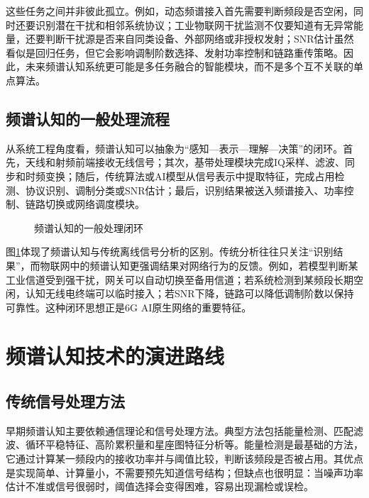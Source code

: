 \documentclass[UTF8,fontset=windows,zihao=-4]{ctexart}
\begin{document}
这些任务之间并非彼此孤立。例如，动态频谱接入首先需要判断频段是否空闲，同时还要识别潜在干扰和相邻系统协议；工业物联网干扰监测不仅要知道有无异常能量，还要判断干扰源是否来自同类设备、外部网络或非授权发射；SNR估计虽然看似是回归任务，但它会影响调制阶数选择、发射功率控制和链路重传策略。因此，未来频谱认知系统更可能是多任务融合的智能模块，而不是多个互不关联的单点算法。

\subsection{频谱认知的一般处理流程}
从系统工程角度看，频谱认知可以抽象为“感知—表示—理解—决策”的闭环。首先，天线和射频前端接收无线信号；其次，基带处理模块完成IQ采样、滤波、同步和时频变换；随后，传统算法或AI模型从信号表示中提取特征，完成占用检测、协议识别、调制分类或SNR估计；最后，识别结果被送入频谱接入、功率控制、链路切换或网络调度模块。

\begin{figure}[H]
\centering
{}
\caption{频谱认知的一般处理闭环}
\label{fig:cognition-loop}
\end{figure}

图\ref{fig:cognition-loop}体现了频谱认知与传统离线信号分析的区别。传统分析往往只关注“识别结果”，而物联网中的频谱认知更强调结果对网络行为的反馈。例如，若模型判断某工业信道受到强干扰，网关可以自动切换至备用信道；若系统检测到某频段长期空闲，认知无线电终端可以临时接入；若SNR下降，链路可以降低调制阶数以保持可靠性。这种闭环思想正是6G AI原生网络的重要特征。

\clearpage
\section{频谱认知技术的演进路线}
\subsection{传统信号处理方法}
早期频谱认知主要依赖通信理论和信号处理方法\cite{haykin}。典型方法包括能量检测、匹配滤波、循环平稳特征、高阶累积量和星座图特征分析等。能量检测是最基础的方法，它通过计算某一频段内的接收功率并与阈值比较，判断该频段是否被占用。其优点是实现简单、计算量小，不需要预先知道信号结构；但缺点也很明显：当噪声功率估计不准或信号很弱时，阈值选择会变得困难，容易出现漏检或误检。
\end{document}
